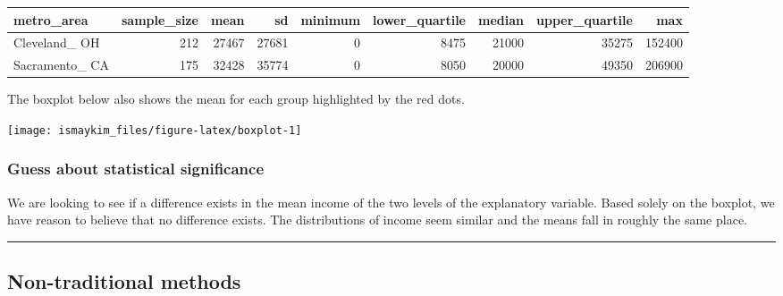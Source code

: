 \documentclass[]{tufte-book}
\newenvironment{Shaded}{\begin{snugshade}}{\end{snugshade}}
\newcommand{\KeywordTok}[1]{\textcolor[rgb]{0.13,0.29,0.53}{\textbf{{#1}}}}
\newcommand{\DataTypeTok}[1]{\textcolor[rgb]{0.13,0.29,0.53}{{#1}}}
\newcommand{\StringTok}[1]{\textcolor[rgb]{0.31,0.60,0.02}{{#1}}}
\newcommand{\NormalTok}[1]{{#1}}
\let\oldrule=\rule
\renewcommand{\rule}[1]{\oldrule{\linewidth}}
\theoremstyle{definition}
\theoremstyle{definition}
\theoremstyle{remark}
\begin{document}
\begin{tabular}{l|r|r|r|r|r|r|r|r}
\hline
metro\_area & sample\_size & mean & sd & minimum & lower\_quartile & median & upper\_quartile & max\\
\hline
Cleveland\_ OH & 212 & 27467 & 27681 & 0 & 8475 & 21000 & 35275 & 152400\\
\hline
Sacramento\_ CA & 175 & 32428 & 35774 & 0 & 8050 & 20000 & 49350 & 206900\\
\hline
\end{tabular}

The boxplot below also shows the mean for each group highlighted by the
red dots.

\begin{Shaded}
\end{Shaded}

\begin{center}\texttt{[image: ismaykim\_files/figure-latex/boxplot-1]} \end{center}

\subsubsection{Guess about statistical
significance}\label{guess-about-statistical-significance-3}

We are looking to see if a difference exists in the mean income of the
two levels of the explanatory variable. Based solely on the boxplot, we
have reason to believe that no difference exists. The distributions of
income seem similar and the means fall in roughly the same place.

\begin{center}\rule{0.5\linewidth}{\linethickness}\end{center}

\subsection{Non-traditional methods}\label{non-traditional-methods-3}
\end{document}
